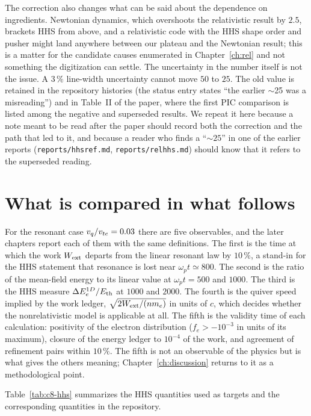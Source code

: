 The correction also changes what can be said about the dependence on ingredients. Newtonian dynamics, which overshoots the relativistic result by $2.5$, brackets HHS from above, and a relativistic code with the HHS shape order and pusher might land anywhere between our plateau and the Newtonian result; this is a matter for the candidate causes enumerated in Chapter~\ref{ch:rel} and not something the digitization can settle. The uncertainty in the number itself is not the issue. A $3\,\%$ line-width uncertainty cannot move $50$ to $25$. The old value is retained in the repository histories (the status entry states ``the earlier $\sim$25 was a misreading'') and in Table~II of the paper, where the first PIC comparison is listed among the negative and superseded results. We repeat it here because a note meant to be read after the paper should record both the correction and the path that led to it, and because a reader who finds a ``$\sim25$'' in one of the earlier reports (\texttt{reports/hhsref.md}, \texttt{reports/relhhs.md}) should know that it refers to the superseded reading.

\section{What is compared in what follows}

For the resonant case $v_q/v_{te}=0.03$ there are five observables, and the later chapters report each of them with the same definitions. The first is the time at which the work $W_{\rm ext}$ departs from the linear resonant law by $10\,\%$, a stand-in for the HHS statement that resonance is lost near $\omega_pt\simeq800$. The second is the ratio of the mean-field energy to its linear value at $\omega_pt=500$ and $1000$. The third is the HHS measure $\Delta E_e^{1D}/E_{\rm th}$ at $1000$ and $2000$. The fourth is the quiver speed implied by the work ledger, $\sqrt{2W_{\rm ext}/(nm_e)}$ in units of $c$, which decides whether the nonrelativistic model is applicable at all. The fifth is the validity time of each calculation: positivity of the electron distribution ($f_e>-10^{-3}$ in units of its maximum), closure of the energy ledger to $10^{-4}$ of the work, and agreement of refinement pairs within $10\,\%$. The fifth is not an observable of the physics but is what gives the others meaning; Chapter~\ref{ch:discussion} returns to it as a methodological point.

Table~\ref{tab:c8-hhs} summarizes the HHS quantities used as targets and the corresponding quantities in the repository.

